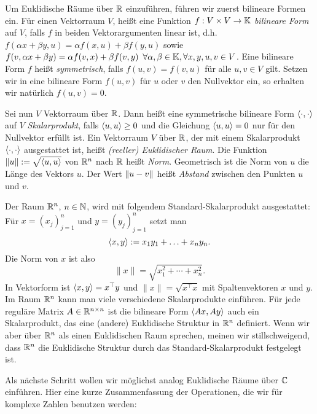 Um Euklidische Räume über $\mathbb R$ einzuführen, führen wir zuerst bilineare Formen ein. 
Für einen Vektorraum $V$, heißt eine Funktion $ f : V \times V \to \mathbb K $ \emph{bilineare Form} auf $ V $, falls $ f $ in beiden Vektorargumenten linear ist, d.h. $ f(\alpha x + \beta y, u) = \alpha f(x,u) + \beta f(y,u) $ sowie $ f(v,\alpha x + \beta y) = \alpha f(v,x) + \beta f(v,y) \enspace \forall \alpha, \beta \in \mathbb K, \forall x,y,u,v \in V $. Eine bilineare Form $f$ heißt \emph{symmetrisch}, falls $ f(u,v) = f(v,u)$ für alle $u,v \in  V $ gilt. Setzen wir in eine bilineare Form $f(u,v)$ für $u$ oder $v$ den Nullvektor ein, so erhalten wir natürlich $f(u,v) = 0$. 


Sei nun $V$ Vektorraum über $\mathbb R$. Dann heißt eine symmetrische bilineare Form $ \left\langle \cdot,\cdot \right\rangle $ auf $V$ \emph{Skalarprodukt}, falls $ \left\langle u,u \right\rangle \geq 0 $ und die Gleichung $ \left\langle u,u \right\rangle = 0 $ nur für den Nullvektor erfüllt ist. Ein Vektorraum $V$ über $ \mathbb R $, der mit einem Skalarprodukt $ \left\langle \cdot,\cdot \right\rangle $ ausgestattet ist, heißt \emph{(reeller) Euklidischer Raum}. Die Funktion $ \left\| u \right\| := \sqrt{\left\langle u,u \right\rangle} $ von $ \mathbb R^n $ nach $ \mathbb R $ heißt \emph{Norm}. Geometrisch ist die Norm von $ u $ die Länge des Vektors $ u $. Der Wert $ \left\| u-v \right\| $ heißt \emph{Abstand} zwischen den Punkten  $ u $ und $ v $.

Der Raum $ \mathbb R^n $, $ n \in \mathbb N $, wird mit folgendem Standard-Skalarprodukt ausgestattet: Für $ x = (x_j)_{j=1}^n $ und $ y = (y_j)_{j=1}^n $ setzt man 
\[
	 \left\langle x,y \right\rangle := x_1y_1 + \ldots + x_ny_n.
\] Die Norm von $x$ ist also 
\[
	\|x\|= \sqrt{x_1^2 + \cdots + x_n^2}. 
\]
In Vektorform ist $ \left\langle x,y \right\rangle = x^\top  y $ und $\|x\| = \sqrt{x^\top x}$ mit Spaltenvektoren $ x $ und $ y $. Im Raum $\mathbb R^n$ kann man viele verschiedene Skalarprodukte einführen. Für jede reguläre Matrix $A \in \mathbb R^{n \times n}$ ist die bilineare Form $\left\langle Ax,Ay \right\rangle$ auch ein Skalarprodukt, das eine (andere) Euklidische Struktur in $\mathbb R^n$ definiert. Wenn wir aber über $\mathbb R^n$ als einen Euklidischen Raum sprechen, meinen wir stillschweigend, dass $\mathbb R^n$ die Euklidische Struktur durch das Standard-Skalarprodukt festgelegt ist. 

Als nächste Schritt wollen wir möglichst analog Euklidische Räume über $\mathbb C$ einführen. Hier eine kurze Zusammenfassung der Operationen, die wir für komplexe Zahlen benutzen werden: 

